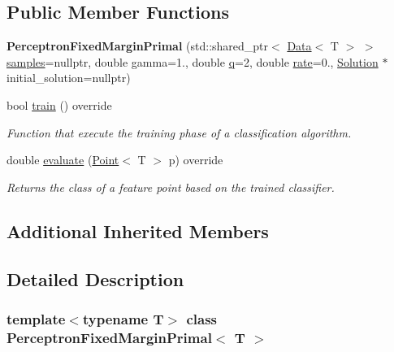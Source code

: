 \subsection*{Public Member Functions}
\begin{DoxyCompactItemize}
\item 
\mbox{\label{class_perceptron_fixed_margin_primal_ac0352938dd986cda1b44c45040a2d46f}} 
{\bfseries Perceptron\+Fixed\+Margin\+Primal} (std\+::shared\+\_\+ptr$<$ \hyperlink{class_data}{Data}$<$ T $>$ $>$ \hyperlink{class_classifier_a0000b47a2e0784ada4c52d7046c4adb8}{samples}=nullptr, double gamma=1., double \hyperlink{class_primal_classifier_ae30c00c25bce4b1623baa54b5e2812b4}{q}=2, double \hyperlink{class_classifier_a7b1c4ef87631bd9e46682e5bc4315111}{rate}=0., \hyperlink{class_solution}{Solution} $\ast$initial\+\_\+solution=nullptr)
\item 
bool \hyperlink{class_perceptron_fixed_margin_primal_a6d4a14b9f39a4fef45de201edfeabce0}{train} () override
\begin{DoxyCompactList}\small\item\em Function that execute the training phase of a classification algorithm. \end{DoxyCompactList}\item 
double \hyperlink{class_perceptron_fixed_margin_primal_a5bfe0f03533361017b594c3fe67f0905}{evaluate} (\hyperlink{class_point}{Point}$<$ T $>$ p) override
\begin{DoxyCompactList}\small\item\em Returns the class of a feature point based on the trained classifier. \end{DoxyCompactList}\end{DoxyCompactItemize}
\subsection*{Additional Inherited Members}


\subsection{Detailed Description}
\subsubsection*{template$<$typename T$>$\newline
class Perceptron\+Fixed\+Margin\+Primal$<$ T $>$}

